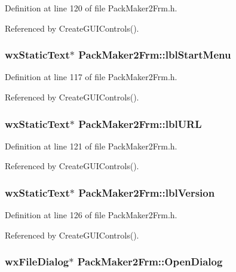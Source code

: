 Definition at line 120 of file Pack\-Maker2Frm.h.

Referenced by Create\-GUIControls().
\subsubsection{\setlength{\rightskip}{0pt plus 5cm}wx\-Static\-Text$\ast$ {\bf Pack\-Maker2Frm::lbl\-Start\-Menu}\hspace{0.3cm}{\tt  [private]}}\label{class_pack_maker2_frm_dadc8844f3883c7e04ba3017a51f6bc7}




Definition at line 117 of file Pack\-Maker2Frm.h.

Referenced by Create\-GUIControls().
\subsubsection{\setlength{\rightskip}{0pt plus 5cm}wx\-Static\-Text$\ast$ {\bf Pack\-Maker2Frm::lbl\-URL}\hspace{0.3cm}{\tt  [private]}}\label{class_pack_maker2_frm_250548fa51e339929577ad355225c2ce}




Definition at line 121 of file Pack\-Maker2Frm.h.

Referenced by Create\-GUIControls().
\subsubsection{\setlength{\rightskip}{0pt plus 5cm}wx\-Static\-Text$\ast$ {\bf Pack\-Maker2Frm::lbl\-Version}\hspace{0.3cm}{\tt  [private]}}\label{class_pack_maker2_frm_411a93dddbd1daa27403182ac4a1dd19}




Definition at line 126 of file Pack\-Maker2Frm.h.

Referenced by Create\-GUIControls().
\subsubsection{\setlength{\rightskip}{0pt plus 5cm}wx\-File\-Dialog$\ast$ {\bf Pack\-Maker2Frm::Open\-Dialog}\hspace{0.3cm}{\tt  [private]}}\label{class_pack_maker2_frm_88c2edb5eb50fb3e6daf3c64f0544e06}




